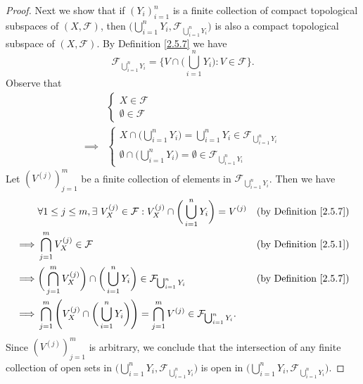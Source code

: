 \begin{proof}
    Next we show that if \((Y_i)_{i = 1}^n\) is a finite collection of compact topological subspaces of \((X, \mathcal{F})\), then \(\big(\bigcup_{i = 1}^n Y_i, \mathcal{F}_{\bigcup_{i = 1}^n Y_i}\big)\) is also a compact topological subspace of \((X, \mathcal{F})\).
    By Definition \ref{2.5.7} we have
    \[
        \mathcal{F}_{\bigcup_{i = 1}^n Y_i} = \bigg\{V \cap \bigg(\bigcup_{i = 1}^n Y_i\bigg) : V \in \mathcal{F}\bigg\}.
    \]
    Observe that
    \begin{align*}
                 & \begin{cases}
                       X \in \mathcal{F} \\
                       \emptyset \in \mathcal{F}
                   \end{cases}                                                                                 \\
        \implies & \begin{cases}
                       X \cap \bigg(\bigcup_{i = 1}^n Y_i\bigg) = \bigcup_{i = 1}^n Y_i \in \mathcal{F}_{\bigcup_{i = 1}^n Y_i} \\
                       \emptyset \cap \bigg(\bigcup_{i = 1}^n Y_i\bigg) = \emptyset \in \mathcal{F}_{\bigcup_{i = 1}^n Y_i}
                   \end{cases}
    \end{align*}
    Let \((V^{(j)})_{j = 1}^m\) be a finite collection of elements in \(\mathcal{F}_{\bigcup_{i = 1}^n Y_i}\).
    Then we have
    \begin{align*}
                 & \forall 1 \leq j \leq m, \exists\ V_X^{(j)} \in \mathcal{F} : V_X^{(j)} \cap \bigg(\bigcup_{i = 1}^n Y_i\bigg) = V^{(j)}                            & \text{(by Definition \ref{2.5.7})} \\
        \implies & \bigcap_{j = 1}^m V_X^{(j)} \in \mathcal{F}                                                                                                         & \text{(by Definition \ref{2.5.1})} \\
        \implies & \bigg(\bigcap_{j = 1}^m V_X^{(j)}\bigg) \cap \bigg(\bigcup_{i = 1}^n Y_i\bigg) \in \mathcal{F}_{\bigcup_{i = 1}^n Y_i}                              & \text{(by Definition \ref{2.5.7})} \\
        \implies & \bigcap_{j = 1}^m \Bigg(V_X^{(j)} \cap \bigg(\bigcup_{i = 1}^n Y_i\bigg)\Bigg) = \bigcap_{j = 1}^m V^{(j)} \in \mathcal{F}_{\bigcup_{i = 1}^n Y_i}.
    \end{align*}
    Since \((V^{(j)})_{j = 1}^m\) is arbitrary, we conclude that the intersection of any finite collection of open sets in \(\big(\bigcup_{i = 1}^n Y_i, \mathcal{F}_{\bigcup_{i = 1}^n Y_i}\big)\) is open in \(\big(\bigcup_{i = 1}^n Y_i, \mathcal{F}_{\bigcup_{i = 1}^n Y_i}\big)\).

\end{proof}
